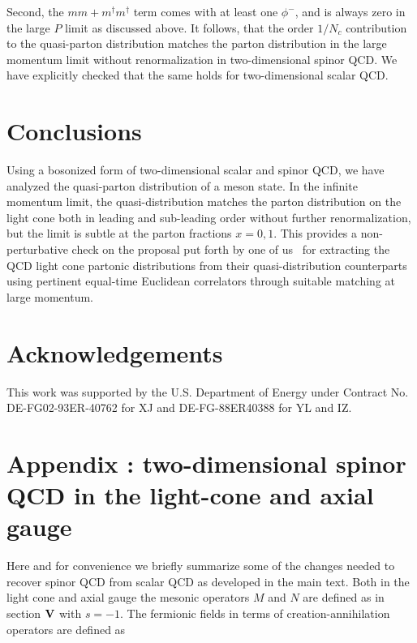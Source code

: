 \documentclass[showpacs,twocolumn,aps,preprintnumbers,letterpaper]{revtex4}
\begin{document}
Second, the $mm+m^{\dagger}m^{\dagger}$ term comes with at least one $\phi^{-}$, and is always zero in the large $P$ limit as discussed above. It follows, that the order $1/N_c$ contribution to the quasi-parton distribution matches the parton distribution
in the large momentum limit without renormalization in two-dimensional spinor QCD. We have explicitly checked that the same holds 
for two-dimensional scalar QCD. 



\section{Conclusions}

Using a bosonized form of two-dimensional scalar and spinor QCD, we have analyzed the quasi-parton 
distribution of a meson state. In the infinite momentum limit, the quasi-distribution matches the parton 
distribution on the light cone both in leading and sub-leading order without further renormalization, 
but the limit is subtle at the parton fractions $x=0,1$. 
This provides a non-perturbative check on the proposal put forth by one of us~\cite{JI1} for extracting the QCD light
cone partonic distributions from their quasi-distribution counterparts using pertinent  equal-time Euclidean correlators
through suitable matching at large momentum. 




\section{Acknowledgements}


This work was supported by the U.S. Department of Energy under Contract No.
DE-FG02-93ER-40762 for XJ and DE-FG-88ER40388 for YL and IZ.






\section{Appendix :  two-dimensional spinor QCD in the light-cone and axial gauge}


Here and for convenience we briefly summarize some of the changes needed to
recover spinor QCD from scalar QCD as developed in the main text. Both in the light cone and axial gauge
 the mesonic operators $M$ and $N$ are defined as in section ${\bf V}$ with $s=-1$. The fermionic fields
 in terms of creation-annihilation operators are defined as 
 
\end{document}
